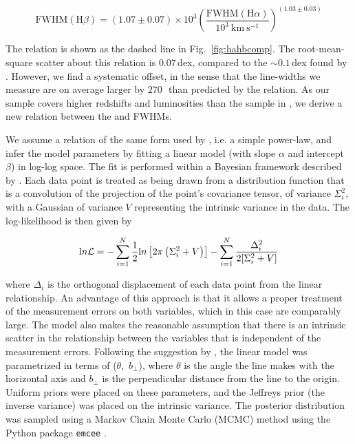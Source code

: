 \begin{equation}
  \mathrm{FWHM}(\mathrm{H}\beta) = \left( 1.07 \pm 0.07 \right) \times 10^3 \left( \frac{ \mathrm{FWHM}(\mathrm{H}\alpha) }{10^3 ~\mathrm{km}~\mathrm{s}^{-1} } \right)^{(1.03 \pm 0.03)}
\end{equation}

The relation is shown as the dashed line in Fig.~\ref{fig:hahbcomp}.
The root-mean-square scatter about this relation is $0.07$\,dex, compared to the $\sim0.1$\,dex found by \citet{greene05b}. 
However, we find a systematic offset, in the sense that the \hb line-widths we measure are on average larger by $270$\,\kms\, than predicted by the \citet{greene05b} relation. 
As our sample covers higher redshifts and luminosities than the sample in \citet{greene05b}, we derive a new relation between the \ha and \hb FWHMs.       

We assume a relation of the same form used by \citet{greene05b}, i.e. a simple power-law, and infer the model parameters by fitting a linear model (with slope $\alpha$ and intercept $\beta$) in log-log space.
The fit is performed within a Bayesian framework described by \citet{hogg10}. 
Each data point is treated as being drawn from a distribution function that is a convolution of the projection of the point's covariance tensor, of variance $\Sigma_i^2$, with a Gaussian of variance $V$ representing the intrinsic variance in the data.
The log-likelihood is then given by 

\begin{equation}
  {\mathrm ln} {\cal L} = - \sum_{i=1}^N \frac{1}{2} {\mathrm ln}\left[2\pi\left(\Sigma_i^2 + V\right)\right] - \sum_{i=1}^N \frac{\Delta_i^2}{2[\Sigma_i^2 + V]} 
\end{equation}

\noindent where $\Delta_i$ is the orthogonal displacement of each data point from the linear relationship. 
An advantage of this approach is that it allows a proper treatment of the measurement errors on both variables, which in this case are comparably large.
The model also makes the reasonable assumption that there is an intrinsic scatter in the relationship between the variables that is independent of the measurement errors.  
Following the suggestion by \citet{hogg10}, the linear model was parametrized in terms of ($\theta$,~$b_\bot$), where $\theta$ is the angle the line makes with the horizontal axis and $b_\bot$ is the perpendicular distance from the line to the origin.
Uniform priors were placed on these parameters, and the Jeffreys prior (the inverse variance) was placed on the intrinsic variance. 
The posterior distribution was sampled using a Markov Chain Monte Carlo (MCMC) method using the Python package {\tt emcee} \citep{foreman13}. 
 

